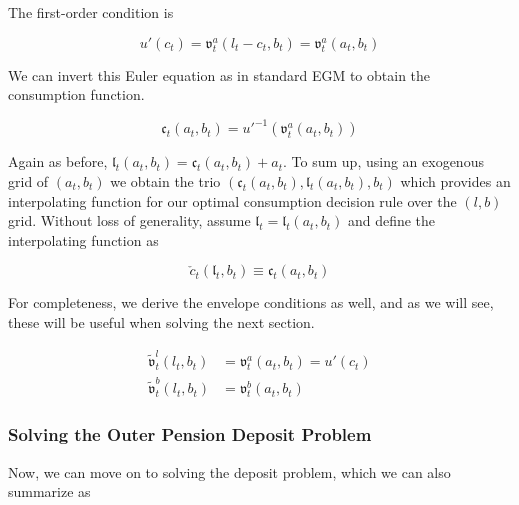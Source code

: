 \documentclass{article}
\newcommand{\util}{u}
\newcommand{\bRat}{b}
\newcommand{\cRat}{c}
\newcommand{\aRat}{a}
\newcommand{\vOpt}{\tilde{\mathfrak{v}}}
\newcommand{\vEnd}{\mathfrak{v}}
\newcommand{\cEndFunc}{\mathfrak{c}}
\newcommand{\lEndFunc}{\mathfrak{l}}
\newcommand{\lRat}{l}
\newcommand{\cTarg}{\check{c}}
\begin{document}
The first-order condition is

\begin{equation}
\util'(\cRat_{t}) = \vEnd_{t}^{\aRat}(\lRat_{t}-\cRat_{t}, \bRat_{t}) =
    \vEnd_{t}^{\aRat}(\aRat_{t}, \bRat_{t})
\end{equation}

We can invert this Euler equation as in standard EGM to obtain the consumption
function.

\begin{equation}
\cEndFunc_{t}(\aRat_{t}, \bRat_{t}) =
    \util'^{-1}\left(\vEnd_{t}^{\aRat}(\aRat_{t}, \bRat_{t})\right)
\end{equation}

Again as before, $\lEndFunc_{t}(\aRat_{t}, \bRat_{t}) =
    \cEndFunc_{t}(\aRat_{t}, \bRat_{t}) + \aRat_{t}$. To sum up, using an
exogenous
grid of $(\aRat_{t}, \bRat_{t})$ we obtain the trio $(\cEndFunc_{t}(\aRat_{t},
    \bRat_{t}), \lEndFunc_{t}(\aRat_{t},
    \bRat_{t}), \bRat_{t})$ which
provides an
interpolating function for our optimal consumption decision rule over the
$(\lRat, \bRat)$ grid. Without loss of generality, assume $\lEndFunc_{t} =
    \lEndFunc_{t}(\aRat_{t}, \bRat_{t})$ and define the interpolating
function as

\begin{equation}
\cTarg_{t}(\lEndFunc_{t}, \bRat_{t}) \equiv \cEndFunc_{t}(\aRat_{t},
    \bRat_{t})
\end{equation}

For completeness, we derive the envelope conditions as well, and as we will
see, these will be useful when solving the next section.

\begin{equation}
\begin{split}
        \vOpt_{t}^{\lRat}(\lRat_{t}, \bRat_{t}) & =
        \vEnd_{t}^{\aRat}(\aRat_{t}, \bRat_{t}) = \util'(\cRat_{t}) \\
        \vOpt_{t}^{\bRat}(\lRat_{t}, \bRat_{t}) & =
        \vEnd_{t}^{\bRat}(\aRat_{t}, \bRat_{t})
    \end{split}
\end{equation}

\subsubsection{Solving the Outer Pension Deposit Problem}\label{Solving the Outer Pension Deposit Problem}

Now, we can move on to solving the deposit problem, which we can also summarize
as
\end{document}
